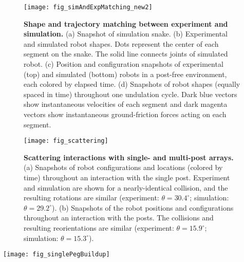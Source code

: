 \documentclass[aps,pre,twocolumn,superscriptaddress]{revtex4-1}
\begin{document}
\begin{figure}[ht!]
	\texttt{[image: fig\_simAndExpMatching\_new2]}
	\caption{\textbf{Shape and trajectory matching between experiment and simulation.} (a) Snapshot of simulation snake. (b) Experimental and simulated robot shapes. Dots represent the center of each segment on the snake. The solid line connects joints of simulated robot. (c) Position and configuration snapshots of experimental (top) and simulated (bottom) robots in a post-free environment, each colored by elapsed time. (d) Snapshots of robot shapes (equally spaced in time) throughout one undulation cycle. Dark blue vectors show instantaneous velocities of each segment and dark magenta vectors show instantaneous ground-friction forces acting on each segment.}
	\label{fig:sim}
\end{figure}

\begin{figure}[ht!]
	\texttt{[image: fig\_scattering]}
	\caption{\textbf{Scattering interactions with single- and multi-post arrays.} (a) Snapshots of robot configurations and locations (colored by time) throughout an interaction with the single post. Experiment and simulation are shown for a nearly-identical collision, and the resulting rotations are similar (experiment: $\theta = 30.4^\circ$; simulation: $\theta = 29.2^\circ$). (b) Snapshots of the robot positions and configurations throughout an interaction with the posts.  The collisions and resulting reorientations are similar (experiment: $\theta = 15.9^\circ$; simulation: $\theta = 15.3^\circ$).}
	\label{fig:scatter}
\end{figure}


\begin{figure*}[ht!]
	\texttt{[image: fig\_singlePegBuildup]}
	\caption{\textbf{Emergence of a single-post scattering pattern.} Left: binary image created from head trajectory in Fig.~\ref{fig:scatter}b. Middle: Summation of binary images from $20$ arbitrarily-chosen initial conditions. Right: Summation of binary images over $481$ initial conditions, evenly sampled within the gray box shown in Fig.~\ref{fig:scatter}b. In each panel, the color of each pixel indicates the number of experiments that traveled through the corresponding point in space.}
	\label{fig:singlepeg}
\end{figure*}
\end{document}
